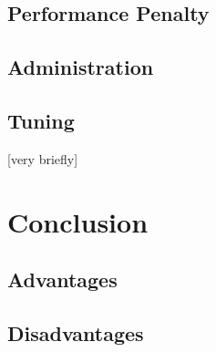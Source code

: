 \documentclass[titlepage, a4paper, 11pt]{scrartcl}
\begin{document}

        \subsection{Performance Penalty}\label{analysis:penalty}



        \subsection{Administration}\label{analysis:administration}

        


        \subsection{Tuning}\label{analysis:tuning}

        [very briefly]


    \section{Conclusion}

        \subsection{Advantages}


        \subsection{Disadvantages}
\end{document}
